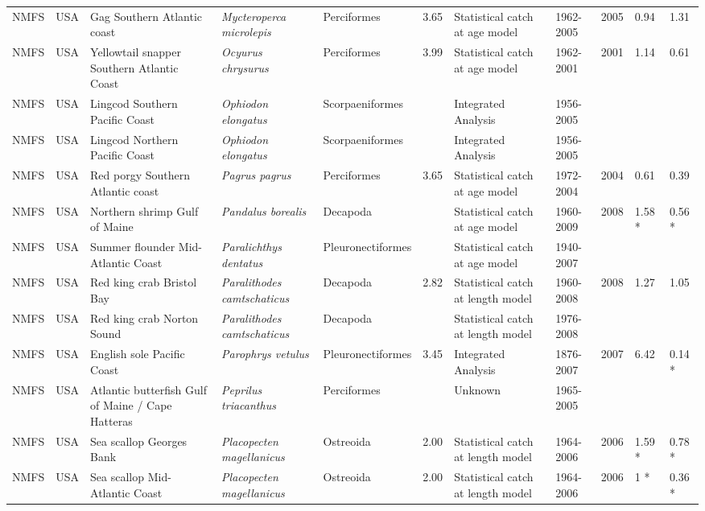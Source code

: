 \begin{longtable}{p{1.5cm}p{1.5cm}p{3cm}p{3cm}p{2.5cm}p{0.9cm}p{1.4cm}p{0.9cm}p{0.9cm}p{0.9cm}p{1cm}}
  NMFS & USA & Gag Southern Atlantic coast & \textit{Mycteroperca microlepis} & Perciformes & 3.65 & Statistical catch at age model & 1962-2005 & 2005 & 0.94 & 1.31 \\ 
  NMFS & USA & Yellowtail snapper Southern Atlantic Coast & \textit{Ocyurus chrysurus} & Perciformes & 3.99 & Statistical catch at age model & 1962-2001 & 2001 & 1.14 & 0.61 \\ 
  NMFS & USA & Lingcod Southern Pacific Coast & \textit{Ophiodon elongatus} & Scorpaeniformes &  & Integrated Analysis & 1956-2005 &  &  &  \\ 
  NMFS & USA & Lingcod Northern Pacific Coast & \textit{Ophiodon elongatus} & Scorpaeniformes &  & Integrated Analysis & 1956-2005 &  &  &  \\ 
  NMFS & USA & Red porgy Southern Atlantic coast & \textit{Pagrus pagrus} & Perciformes & 3.65 & Statistical catch at age model & 1972-2004 & 2004 & 0.61 & 0.39 \\ 
  NMFS & USA & Northern shrimp Gulf of Maine & \textit{Pandalus borealis} & Decapoda &  & Statistical catch at age model & 1960-2009 & 2008 & 1.58 * & 0.56 * \\ 
  NMFS & USA & Summer flounder Mid-Atlantic Coast & \textit{Paralichthys dentatus} & Pleuronectiformes &  & Statistical catch at age model & 1940-2007 &  &  &  \\ 
  NMFS & USA & Red king crab Bristol Bay & \textit{Paralithodes camtschaticus} & Decapoda & 2.82 & Statistical catch at length model & 1960-2008 & 2008 & 1.27 & 1.05 \\ 
  NMFS & USA & Red king crab Norton Sound & \textit{Paralithodes camtschaticus} & Decapoda &  & Statistical catch at length model & 1976-2008 &  &  &  \\ 
  NMFS & USA & English sole Pacific Coast & \textit{Parophrys vetulus} & Pleuronectiformes & 3.45 & Integrated Analysis & 1876-2007 & 2007 & 6.42 & 0.14 * \\ 
  NMFS & USA & Atlantic butterfish Gulf of Maine / Cape Hatteras & \textit{Peprilus triacanthus} & Perciformes &  & Unknown & 1965-2005 &  &  &  \\ 
  NMFS & USA & Sea scallop Georges Bank & \textit{Placopecten magellanicus} & Ostreoida & 2.00 & Statistical catch at length model & 1964-2006 & 2006 & 1.59 * & 0.78 * \\ 
  NMFS & USA & Sea scallop Mid-Atlantic Coast & \textit{Placopecten magellanicus} & Ostreoida & 2.00 & Statistical catch at length model & 1964-2006 & 2006 & 1 * & 0.36 * \\ 

\end{longtable}
